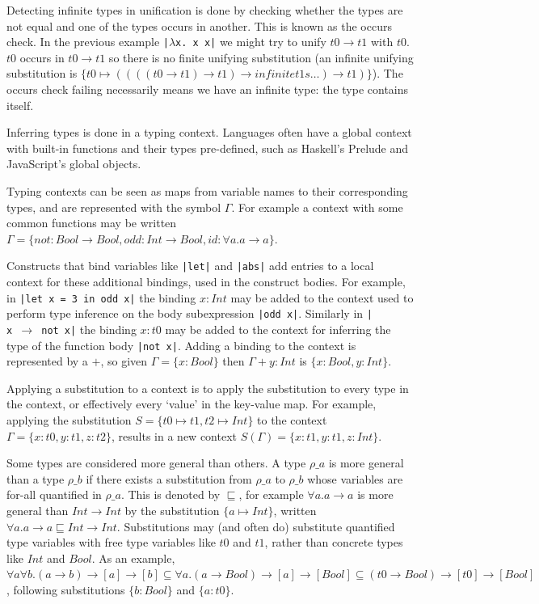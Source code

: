 \documentclass[a4paper,fleqn,twoside,12pt]{report}
\begin{document}
Detecting infinite types in unification is done by checking whether the types are not equal and one of the types occurs in another. This is known as the occurs check. In the previous example \texttt{|$\lambda$x. x x|} we might try to unify $t0 \rightarrow t1$ with $t0$. $t0$ occurs in $t0 \rightarrow t1$ so there is no finite unifying substitution (an infinite unifying substitution is $\{ t0 \mapsto ((((t0 \rightarrow t1) \rightarrow t1) \rightarrow infinite t1s \dots) \rightarrow t1) \}$). The occurs check failing necessarily means we have an infinite type: the type contains itself.

Inferring types is done in a typing context. Languages often have a global context with built-in functions and their types pre-defined, such as Haskell’s Prelude and JavaScript’s global objects.

Typing contexts can be seen as maps from variable names to their corresponding types, and are represented with the symbol $\Gamma$. For example a context with some common functions may be written $\Gamma = \{ not: Bool \rightarrow Bool, odd: Int \rightarrow Bool, id: \forall a. a \rightarrow a \}$.

Constructs that bind variables like \texttt{|let|} and \texttt{|abs|} add entries to a local context for these additional bindings, used in the construct bodies. For example, in \texttt{|let x = 3 in odd x|} the binding $x: Int$ may be added to the context used to perform type inference on the body subexpression \texttt{|odd x|}. Similarly in \texttt{|\\x $\rightarrow$ not x|} the binding $x: t0$ may be added to the context for inferring the type of the function body \texttt{|not x|}. Adding a binding to the context is represented by a $+$, so given $\Gamma = \{ x: Bool \}$ then $\Gamma + y: Int$ is $\{ x: Bool, y: Int \}$.

Applying a substitution to a context is to apply the substitution to every type in the context, or effectively every ‘value’ in the key-value map. For example, applying the substitution $S = \{ t0 \mapsto t1, t2 \mapsto Int \}$ to the context $\Gamma = \{ x: t0, y: t1, z: t2 \}$, results in a new context $S(\Gamma) = \{ x: t1, y: t1, z: Int \}$.

Some types are considered more general than others. A type $\rho\_a$ is more general than a type $\rho\_b$ if there exists a substitution from $\rho\_a$ to $\rho\_b$ whose variables are for-all quantified in $\rho\_a$. This is denoted by $\sqsubseteq$, for example $\forall a. a \rightarrow a$ is more general than $Int \rightarrow Int$ by the substitution $\{ a \mapsto Int \}$, written $\forall a. a \rightarrow a \sqsubseteq Int \rightarrow Int$. Substitutions may (and often do) substitute quantified type variables with free type variables like $t0$ and $t1$, rather than concrete types like $Int$ and $Bool$. As an example, $\forall a \forall b. (a \rightarrow b) \rightarrow [a] \rightarrow [b] \subseteq \forall a. (a \rightarrow Bool) \rightarrow [a] \rightarrow [Bool] \subseteq (t0 \rightarrow Bool) \rightarrow [t0] \rightarrow [Bool]$, following substitutions $\{ b: Bool \}$ and $\{ a: t0 \}$.
\end{document}
